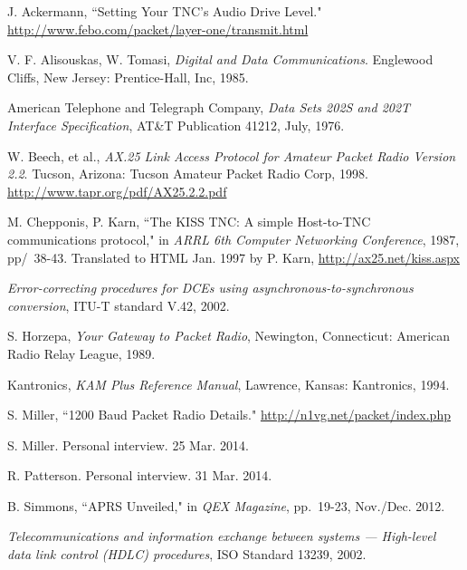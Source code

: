 \documentclass[12pt,letterpaper]{article}
\begin{document}
\begin{thebibliography}{99}

		J. Ackermann,
		``Setting Your TNC's Audio Drive Level."
		\url{http://www.febo.com/packet/layer-one/transmit.html}

		V. F. Alisouskas, W. Tomasi, 
		\emph{Digital and Data Communications}.
		Englewood Cliffs, New Jersey: Prentice-Hall, Inc, 1985.

		American Telephone and Telegraph Company,
		\emph{Data Sets 202S and 202T Interface Specification},
		AT\&T Publication 41212,
		July, 1976.

		W. Beech, et al.,
		\emph{AX.25 Link Access Protocol for Amateur Packet Radio Version 2.2}.
		Tucson, Arizona: Tucson Amateur Packet Radio Corp, 1998. 
		\url{http://www.tapr.org/pdf/AX25.2.2.pdf}
	
		M. Chepponis, P. Karn,
		``The KISS TNC: A simple Host-to-TNC communications protocol,"
		in \emph{ARRL 6th Computer Networking Conference},
		1987, pp/~38-43.
		Translated to HTML Jan. 1997 by P. Karn,
		\url{http://ax25.net/kiss.aspx}

		\emph{Error-correcting procedures for DCEs using 
		asynchronous-to-synchronous conversion}, ITU-T standard V.42, 2002.

		S. Horzepa,
		\emph{Your Gateway to Packet Radio},
		Newington, Connecticut: American Radio Relay League, 1989.

		Kantronics,
		\emph{KAM Plus Reference Manual},
		Lawrence, Kansas: Kantronics, 1994.

		S. Miller,
		``1200 Baud Packet Radio Details."
		\url{http://n1vg.net/packet/index.php}
	
		S. Miller. Personal interview. 25 Mar. 2014.

		R. Patterson. Personal interview. 31 Mar. 2014.

		B. Simmons,
		``APRS Unveiled," in \emph{QEX Magazine},
		pp.~19-23,
		Nov./Dec. 2012.

		\emph{Telecommunications and information
			exchange between systems --- High-level data link control (HDLC)
		procedures}, ISO Standard 13239, 2002.

\end{thebibliography}
\end{document}
